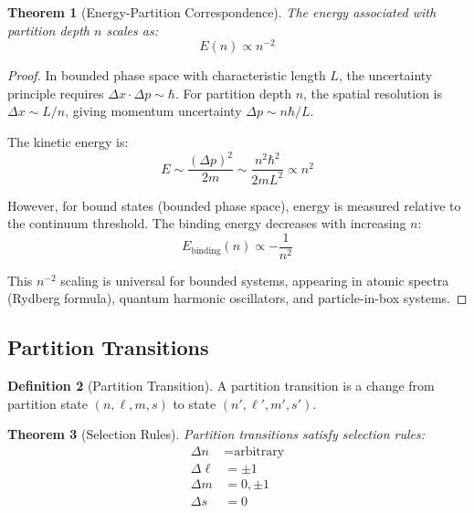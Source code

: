 \documentclass[11pt,twocolumn,a4paper]{article}
\newtheorem{theorem}{Theorem}[section]
\theoremstyle{definition}
\newtheorem{definition}[theorem]{Definition}
\theoremstyle{remark}
\begin{document}
\begin{theorem}[Energy-Partition Correspondence]
\label{thm:energy_partition}
The energy associated with partition depth $n$ scales as:
\begin{equation}
E(n) \propto n^{-2}
\label{eq:energy_scaling}
\end{equation}
\end{theorem}

\begin{proof}
In bounded phase space with characteristic length $L$, the uncertainty principle requires $\Delta x \cdot \Delta p \sim \hbar$. For partition depth $n$, the spatial resolution is $\Delta x \sim L/n$, giving momentum uncertainty $\Delta p \sim n\hbar/L$.

The kinetic energy is:
\begin{equation}
E \sim \frac{(\Delta p)^2}{2m} \sim \frac{n^2\hbar^2}{2mL^2} \propto n^2
\end{equation}

However, for bound states (bounded phase space), energy is measured relative to the continuum threshold. The binding energy decreases with increasing $n$:
\begin{equation}
E_{\mathrm{binding}}(n) \propto -\frac{1}{n^2}
\end{equation}

This $n^{-2}$ scaling is universal for bounded systems, appearing in atomic spectra (Rydberg formula), quantum harmonic oscillators, and particle-in-box systems.
\end{proof}

\subsection{Partition Transitions}

\begin{definition}[Partition Transition]
\label{def:partition_transition}
A partition transition is a change from partition state $(n,\ell,m,s)$ to state $(n',\ell',m',s')$.
\end{definition}

\begin{theorem}[Selection Rules]
\label{thm:selection_rules}
Partition transitions satisfy selection rules:
\begin{align}
\Delta n &= \text{arbitrary} \label{eq:delta_n} \\
\Delta \ell &= \pm 1 \label{eq:delta_ell} \\
\Delta m &= 0, \pm 1 \label{eq:delta_m} \\
\Delta s &= 0 \label{eq:delta_s}
\end{align}
\end{theorem}
\end{document}
